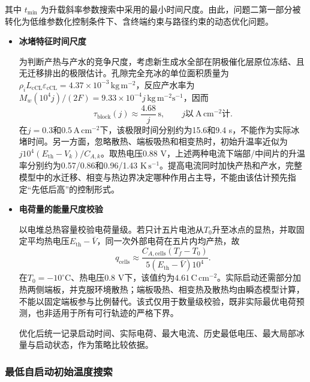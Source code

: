 \documentclass[bwprint]{gmcmthesis}
\numberwithin{equation}{section}
\numberwithin{figure}{section}
\begin{document}
其中 \(t_{\min}\) 为升载斜率参数搜索中采用的最小时间尺度。由此，问题二第一部分被转化为低维参数化控制条件下、含终端约束与路径约束的动态优化问题。

\begin{itemize}
\renewcommand{\labelitemi}{$\blacktriangleright$}
\item \textbf {冰堵特征时间尺度}

 为判断产热与产水的竞争尺度，考虑新生成水全部在阴极催化层原位冻结、且无迁移排出的极限估计。孔隙完全充冰的单位面积质量为$\rho_iL_{\mathrm{cCL}}\varepsilon_{\mathrm{cCL}}=4.37\times10^{-3}\,\mathrm{kg\,m^{-2}}$，反应产水率为$M_w(10^4j)/(2F)=9.33\times10^{-4}j\,\mathrm{kg\,m^{-2}s^{-1}}$，因而
\begin{equation}
\tau_{\mathrm{block}}(j)\approx\frac{4.68}{j}\,\mathrm s,\qquad j\text{以}\ \mathrm{A\,cm^{-2}}\text{计}.\label{eq:src:5-59}
\end{equation}
在$j=0.3$和$0.5\,\mathrm{A\,cm^{-2}}$下，该极限时间分别约为15.6和9.4 s，不能作为实际冰堵时间。另一方面，忽略散热、端板吸热和相变热时，初始升温率近似为$j10^4(E_{\mathrm{th}}-V_k)/C_{A,k}$。取热电压0.88 V，上述两种电流下端部/中间片的升温率分别约为0.57/0.86和0.96/1.43 $\mathrm{K\,s^{-1}}$。提高电流同时加快产热和产水，完整模型中的水迁移、相变与热边界决定哪种作用占主导，不能由该估计预先指定“先低后高”的控制形式。

\item \textbf {电荷量的能量尺度校验}

 以电堆总热容量校验电荷量级。若只计五片电池从$T_0$升至冰点的显热，并取固定平均热电压$E_{\mathrm{th}}-\bar V$，同一次外部电荷在五片内均产热，故
\begin{equation}
q_{\mathrm{cells}}\approx\frac{C_{A,\mathrm{cells}}(T_f-T_0)}{5(E_{\mathrm{th}}-\bar V)10^4}.\label{eq:src:5-63}
\end{equation}
在$T_0=-10^\circ\mathrm C$、热电压0.8 V下，该值约为$4.61\,\mathrm{C\,cm^{-2}}$。实际启动还需部分加热两侧端板，并克服环境散热；端板吸热、相变热及散热均由瞬态模型计算，不能以固定端板参与比例替代。该式仅用于数量级校验，既非实际最优电荷预测，也非适用于所有可行轨迹的严格下界。

 优化后统一记录启动时间、实际电荷、最大电流、历史最低电压、最大局部冰量与启动状态，作为策略比较依据。

\end{itemize}


\subsubsection{最低自启动初始温度搜索}
\end{document}
